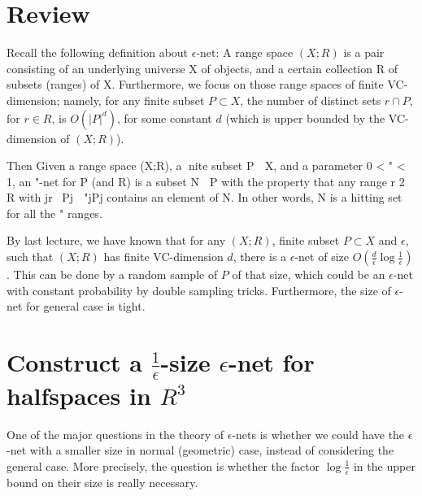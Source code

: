 \documentclass[11pt]{article}
\begin{document}
\setlength{\fboxrule}{.5mm}\setlength{\fboxsep}{1.2mm}
\newlength{\boxlength}\setlength{\boxlength}{\textwidth}
\addtolength{\boxlength}{-4mm}
\begin{center}\end{center}
\vspace{5mm}

\section{Review}
Recall the following definition about $\epsilon$-net:
A range space $(X;R)$ is a pair consisting of an underlying universe X of objects, and a certain collection
	R of subsets (ranges) of X. 
Furthermore, we focus on those range spaces of finite  VC-dimension; namely, for any finite subset $P\subset X$, the number of distinct sets $r\cap P$,
for $r\in R$, is $O(|P|^d)$, for some constant $d$ (which is upper bounded by the VC-dimension of $(X;R)$).

Then Given a range space (X;R), a nite subset P  X, and a parameter 0 < " < 1, an "-net for P (and
R) is a subset N  P with the property that any range r 2 R with jr \ Pj  "jPj contains an element
of N. In other words, N is a hitting set for all the \heavy" ranges.

By last lecture, we have known that for any $(X;R)$, finite subset $P\subset X$ and $\epsilon$, such
	that $(X;R)$ has finite  VC-dimension $d$,
	there is a $\epsilon$-net of size $O(\frac{d}{\epsilon}\log \frac{1}{\epsilon})$. 
This can be done by a random
	sample of $P$ of that size, which could be an $\epsilon$-net with constant probability by
	double sampling tricks. 
Furthermore, the size of $\epsilon$-net for general case is tight.

\section{Construct a $\frac{1}{\epsilon}$-size $\epsilon$-net for halfspaces in $R^3$}


One of the major questions in the theory of $\epsilon$-nets is whether we could have 
	the $\epsilon$-net with a smaller size in normal (geometric) case, instead of considering the general case.
More precisely, the question is whether the factor $\log \frac{1}{\epsilon}$
	 in the upper bound on their size is really necessary.
\end{document}
